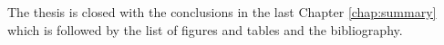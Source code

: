 % 
% 

The thesis is closed with the conclusions in the last Chapter \ref{chap:summary}
which is followed by the list of figures and tables and the bibliography.














